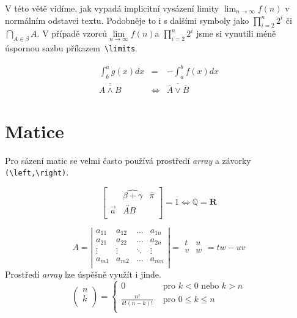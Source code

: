 \documentclass[a4paper, 11pt]{article}
\begin{document}
\begin{twocolumn}
V této větě vidíme, jak vypadá implicitní vysázení limity $\lim_{n\to\infty} f(n)$ v normálním odstavci textu. Podobněje to i s dalšími symboly jako $\prod_{i=2}^n 2^i$ či $\bigcap_{A \in \beta}A$.
V případě vzorců$\lim\limits_{n\to\infty} f(n)$a $\prod\limits_{i=2}^n 2^i$ jsme si vynutili méně úspornou sazbu příkazem\verb| \limits|.

\begin{eqnarray}
\int_b^a{g(x)dx} & = & {-\int_a^b{f(x)dx}}\\
\overline{\overline{A \wedge B}} & \Leftrightarrow & \overline{\overline{A} \vee \overline{B}} 
\end{eqnarray}




\section{Matice}
Pro sázení matic se velmi často používá prostředí \emph{array} a závorky \verb|(\left,\right)|.

\[   
  \left[ {\begin{array}{ccc}
    & \widehat{\beta + \gamma} & \hat{\pi} \\
   \vec{a} & \overleftrightarrow{AB} \\
  \end{array} } \right]
  = 1 \iff 
  \mathbb{Q} =  \mathbf{R}
\]

\[ 
A = 
  \left| {\begin{array}{cccc}
   a_{11} & a_{12} & \ldots & a_{1n} \\
   a_{21} & a_{22} & \ldots & a_{2n} \\
   \vdots & \vdots & \ddots & \vdots \\
   a_{m1} & a_{m2} & \ldots & a_{mn} \\
  \end{array} } \right|
  = 
 {\begin{array}{cc}
   t & u \\
   v & w  \\
  \end{array} } 
  =
  tw - uv
\]
Prostředí \emph{array} lze úspěšně využít i jinde.
\[   
  \left( {\begin{array}{c}
    n \\
   k \\
  \end{array} } \right)
  =
  \left\{ {\begin{array}{ll}
    0 & \text{ pro } k < 0 \text{ nebo } k > n \\
   \frac{n!}{k!(n-k)!} & \text{ pro } 0 \leq k \leq n  \\
  \end{array} } \right.
\]


\end{twocolumn}
\end{document}
